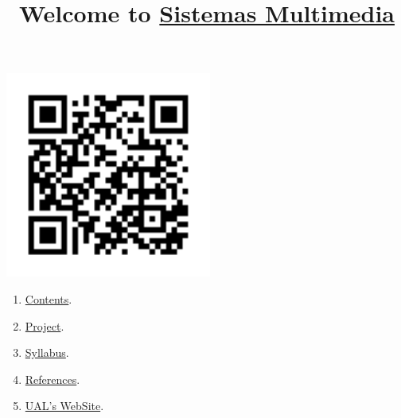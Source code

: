 
%
\title{Welcome to \href{https://sistemas-multimedia.github.io/}{Sistemas Multimedia}}

\maketitle

\begin{center}
  \includegraphics[width=256px]{SM_codigo_QR.png}
\end{center}

\begin{enumerate}
\item \href{https://sistemas-multimedia.github.io/contents}{Contents}.
\item \href{https://github.com/Sistemas-Multimedia/VCF}{Project}.
\item \href{https://sistemas-multimedia.github.io/syllabus}{Syllabus}.
\item \href{https://sistemas-multimedia.github.io/references}{References}.
\item \href{https://www.ual.es/estudios/masteres/presentacion/plandeestudios/asignatura/7132/71321105}{UAL's WebSite}.
\end{enumerate}
